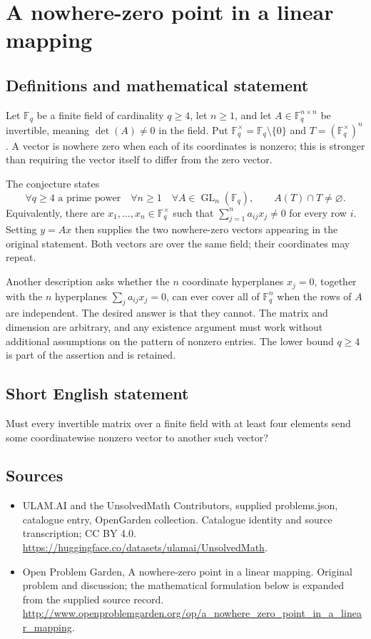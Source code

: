 \documentclass[11pt,a4paper]{article}
\begin{document}
\section*{A nowhere-zero point in a linear mapping}\label{statement}

\subsection{Definitions and mathematical statement}
Let $\mathbb F_q$ be a finite field of cardinality $q\ge4$, let $n\ge1$,
and let $A\in\mathbb F_q^{n\times n}$ be invertible, meaning
$\det(A)\ne0$ in the field. Put
$\mathbb F_q^\times=\mathbb F_q\setminus\{0\}$ and
$T=(\mathbb F_q^\times)^n$.
A vector is nowhere zero when each of its coordinates is nonzero; this
is stronger than requiring the vector itself to differ from the zero vector.

The conjecture states
\[
 \forall q\ge4\text{ a prime power}\quad\forall n\ge1\quad
 \forall A\in\operatorname{GL}_n(\mathbb F_q),\qquad
 A(T)\cap T\ne\varnothing.
\]
Equivalently, there are $x_1,\ldots,x_n\in\mathbb F_q^\times$ such that
$\sum_{j=1}^n a_{ij}x_j\ne0$ for every row $i$. Setting $y=Ax$ then
supplies the two nowhere-zero vectors appearing in the original statement.
Both vectors are over the same field; their coordinates may repeat.

Another description asks whether the $n$ coordinate hyperplanes
$x_j=0$, together with the $n$ hyperplanes
$\sum_j a_{ij}x_j=0$, can ever cover all of $\mathbb F_q^n$ when the rows
of $A$ are independent. The desired answer is that they cannot.
The matrix and dimension are arbitrary, and any existence argument must
work without additional assumptions on the pattern of nonzero entries.
The lower bound $q\ge4$ is part of the assertion and is retained.
\subsection{Short English statement}
Must every invertible matrix over a finite field with at least four elements send some coordinatewise nonzero vector to another such vector?
\subsection{Sources}
\begin{itemize}
\item[S1] ULAM.AI and the UnsolvedMath Contributors, supplied problems.json, catalogue entry, OpenGarden collection. Catalogue identity and source transcription; CC BY 4.0.
\url{https://huggingface.co/datasets/ulamai/UnsolvedMath}.
\item[S2] Open Problem Garden, A nowhere-zero point in a linear mapping. Original problem and discussion; the mathematical formulation below is expanded from the supplied source record.
\url{http://www.openproblemgarden.org/op/a_nowhere_zero_point_in_a_linear_mapping}.
\end{itemize}
\end{document}
